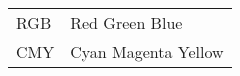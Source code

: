 \begin{singlespace}
\begin{flushleft}
\begin{longtable}{p{2 cm}p{14 cm}}
  RGB & Red Green Blue \\
  CMY & Cyan Magenta Yellow
  
\end{longtable}
\end{flushleft}
\end{singlespace}
